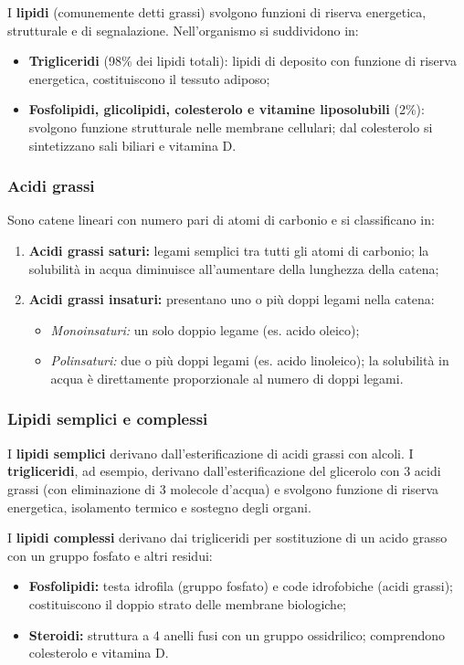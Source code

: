\documentclass[11pt,a4paper,openright,twoside]{book}
\theoremstyle{definition}
\theoremstyle{plain}
\theoremstyle{remark}
\begin{document}
I \textbf{lipidi} (comunemente detti grassi) svolgono funzioni di riserva energetica, strutturale e di segnalazione. Nell'organismo si suddividono in:
\begin{itemize}
  \item \textbf{Trigliceridi} (98\% dei lipidi totali): lipidi di deposito con funzione di riserva energetica, costituiscono il tessuto adiposo;
  \item \textbf{Fosfolipidi, glicolipidi, colesterolo e vitamine liposolubili} (2\%): svolgono funzione strutturale nelle membrane cellulari; dal colesterolo si sintetizzano sali biliari e vitamina D.
\end{itemize}

\subsubsection{Acidi grassi}

Sono catene lineari con numero pari di atomi di carbonio e si classificano in:
\begin{enumerate}
  \item \textbf{Acidi grassi saturi:} legami semplici tra tutti gli atomi di carbonio; la solubilità in acqua diminuisce all'aumentare della lunghezza della catena;
  \item \textbf{Acidi grassi insaturi:} presentano uno o più doppi legami nella catena:
    \begin{itemize}
      \item \textit{Monoinsaturi:} un solo doppio legame (es. acido oleico);
      \item \textit{Polinsaturi:} due o più doppi legami (es. acido linoleico); la solubilità in acqua è direttamente proporzionale al numero di doppi legami.
    \end{itemize}
\end{enumerate}

\subsubsection{Lipidi semplici e complessi}

I \textbf{lipidi semplici} derivano dall'esterificazione di acidi grassi con alcoli. I \textbf{trigliceridi}, ad esempio, derivano dall'esterificazione del glicerolo con 3 acidi grassi (con eliminazione di 3 molecole d'acqua) e svolgono funzione di riserva energetica, isolamento termico e sostegno degli organi.

I \textbf{lipidi complessi} derivano dai trigliceridi per sostituzione di un acido grasso con un gruppo fosfato e altri residui:
\begin{itemize}
  \item \textbf{Fosfolipidi:} testa idrofila (gruppo fosfato) e code idrofobiche (acidi grassi); costituiscono il doppio strato delle membrane biologiche;
  \item \textbf{Steroidi:} struttura a 4 anelli fusi con un gruppo ossidrilico; comprendono colesterolo e vitamina D.
\end{itemize}
\end{document}
